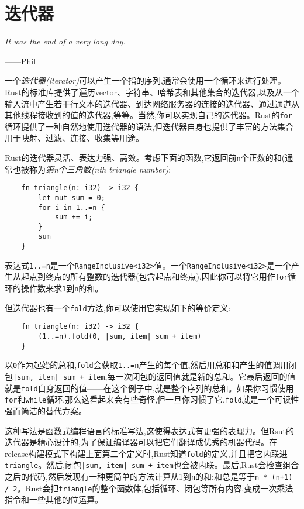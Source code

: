\chapter{迭代器}\label{ch15}

\emph{It was the end of a very long day.}

\begin{flushright}
    ——Phil
\end{flushright}

一个\emph{迭代器(iterator)}可以产生一个指的序列,通常会使用一个循环来进行处理。Rust的标准库提供了遍历vector、字符串、哈希表和其他集合的迭代器,以及从一个输入流中产生若干行文本的迭代器、到达网络服务器的连接的迭代器、通过通道从其他线程接收到的值的迭代器,等等。当然,你可以实现自己的迭代器。Rust的\texttt{for}循环提供了一种自然地使用迭代器的语法,但迭代器自身也提供了丰富的方法集合用于映射、过滤、连接、收集等用途。

Rust的迭代器灵活、表达力强、高效。考虑下面的函数,它返回前\texttt{n}个正数的和(通常也被称为\emph{第n个三角数(nth triangle number)}:
\begin{verbatim}
    fn triangle(n: i32) -> i32 {
        let mut sum = 0;
        for i in 1..=n {
            sum += i;
        }
        sum
    }
\end{verbatim}

表达式\texttt{1..=n}是一个\texttt{RangeInclusive<i32>}值。一个\texttt{RangeInclusive<i32>}是一个产生从起点到终点的所有整数的迭代器(包含起点和终点),因此你可以将它用作\texttt{for}循环的操作数来求\texttt{1}到\texttt{n}的和。

但迭代器也有一个\texttt{fold}方法,你可以使用它实现如下的等价定义:
\begin{verbatim}
    fn triangle(n: i32) -> i32 {
        (1..=n).fold(0, |sum, item| sum + item)
    }
\end{verbatim}

以\texttt{0}作为起始的总和,\texttt{fold}会获取\texttt{1..=n}产生的每个值,然后用总和和产生的值调用闭包\texttt{|sum, item| sum + item},每一次闭包的返回值就是新的总和。它最后返回的值就是\texttt{fold}自身返回的值——在这个例子中,就是整个序列的总和。如果你习惯使用\texttt{for}和\texttt{while}循环,那么这看起来会有些奇怪,但一旦你习惯了它,\texttt{fold}就是一个可读性强而简洁的替代方案。

这种写法是函数式编程语言的标准写法,这使得表达式有更强的表现力。但Rsut的迭代器是精心设计的,为了保证编译器可以把它们翻译成优秀的机器代码。在release构建模式下构建上面第二个定义时,Rust知道\texttt{fold}的定义,并且把它内联进\texttt{triangle}。然后,闭包\texttt{|sum, item| sum + item}也会被内联。最后,Rust会检查组合之后的代码,然后发现有一种更简单的方法计算从1到\texttt{n}的和:和总是等于\texttt{n * (n+1) / 2}。Rust会把\texttt{triangle}的整个函数体,包括循环、闭包等所有内容,变成一次乘法指令和一些其他的位运算。

